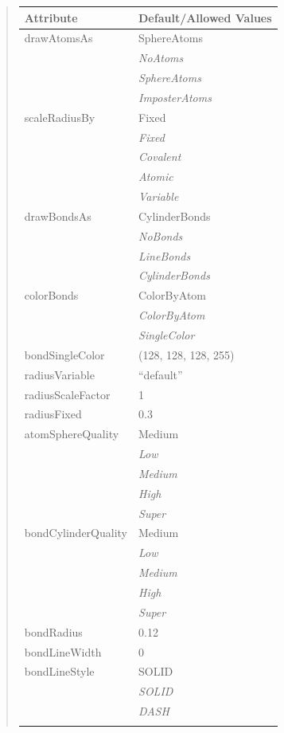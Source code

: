 \documentclass[letterpaper,10pt,english]{sphinxmanual}
\begin{document}
\begin{quote}
\begin{longtable}{|l|l|}
\textbf{Attribute}
 & 
\textbf{Default/Allowed Values}
\\
\hline
drawAtomsAs
 & 
SphereAtoms
\\
\hline & 
\emph{NoAtoms}
\\
\hline & 
\emph{SphereAtoms}
\\
\hline & 
\emph{ImposterAtoms}
\\
\hline
scaleRadiusBy
 & 
Fixed
\\
\hline & 
\emph{Fixed}
\\
\hline & 
\emph{Covalent}
\\
\hline & 
\emph{Atomic}
\\
\hline & 
\emph{Variable}
\\
\hline
drawBondsAs
 & 
CylinderBonds
\\
\hline & 
\emph{NoBonds}
\\
\hline & 
\emph{LineBonds}
\\
\hline & 
\emph{CylinderBonds}
\\
\hline
colorBonds
 & 
ColorByAtom
\\
\hline & 
\emph{ColorByAtom}
\\
\hline & 
\emph{SingleColor}
\\
\hline
bondSingleColor
 & 
(128, 128, 128, 255)
\\
\hline
radiusVariable
 & 
``default''
\\
\hline
radiusScaleFactor
 & 
1
\\
\hline
radiusFixed
 & 
0.3
\\
\hline
atomSphereQuality
 & 
Medium
\\
\hline & 
\emph{Low}
\\
\hline & 
\emph{Medium}
\\
\hline & 
\emph{High}
\\
\hline & 
\emph{Super}
\\
\hline
bondCylinderQuality
 & 
Medium
\\
\hline & 
\emph{Low}
\\
\hline & 
\emph{Medium}
\\
\hline & 
\emph{High}
\\
\hline & 
\emph{Super}
\\
\hline
bondRadius
 & 
0.12
\\
\hline
bondLineWidth
 & 
0
\\
\hline
bondLineStyle
 & 
SOLID
\\
\hline & 
\emph{SOLID}
\\
\hline & 
\emph{DASH}
\\
\hline & 

\end{longtable}
\end{quote}
\end{document}
